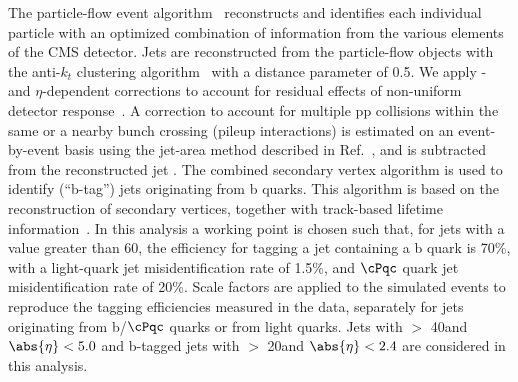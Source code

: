 The particle-flow event algorithm~\cite{CMS-PAS-PFT-09-001,CMS-PAS-PFT-10-001} reconstructs and identifies each individual particle with an optimized combination of information from the various elements of the CMS detector. 
Jets are reconstructed from the particle-flow objects with the anti-$k_t$ clustering
algorithm~\cite{Cacciari:2008gp} with a distance parameter of 0.5. We apply
\pt- and $\eta$-dependent corrections to account for residual
effects of non-uniform detector response~\cite{Chatrchyan:2011ds}.
A correction to account for multiple pp collisions within the same or a nearby
bunch crossing (pileup interactions) is estimated on an event-by-event basis using the
jet-area method described in Ref.~\cite{Cacciari:2007fd}, and is
subtracted from the reconstructed jet \pt.
The combined secondary vertex algorithm is used to identify (``b-tag'') jets 
originating from b quarks.  This algorithm 
 is based on the reconstruction of secondary vertices, together with track-based lifetime information~\cite{Chatrchyan:2012jua}. 
In this analysis a working point is chosen such that, for jets with a \PT value greater than 60\GeV, the efficiency for tagging a jet containing a b quark is 70\%, with a light-quark jet misidentification rate of 1.5\%, and $\cPqc$ quark jet misidentification rate of 20\%.
Scale factors are applied to the simulated events to reproduce the tagging efficiencies measured in the data, 
separately for jets originating from b/$\cPqc$ quarks or from light quarks.
Jets with  \PT $>$ 40\GeV and $\abs{\eta} < 5.0$ and b-tagged jets with \PT $>$ 20\GeV and $\abs{\eta} < 2.4$ are considered in this analysis.


